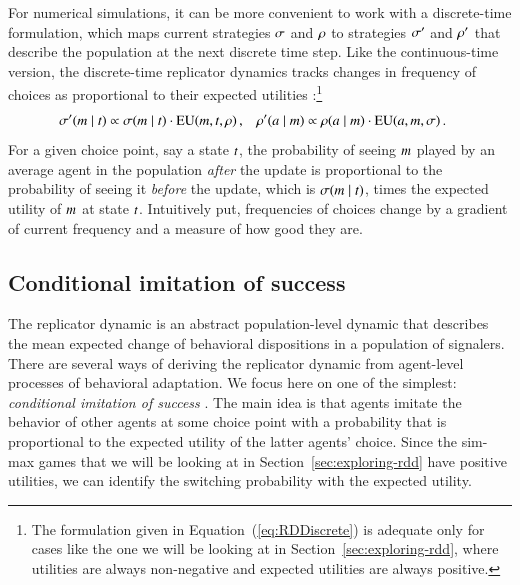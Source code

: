 \documentclass[fleqn,reqno,10pt]{article}
\begin{document}
For numerical simulations, it can be more convenient to work with a discrete-time formulation,
which maps current strategies $\sigma$ and $\rho$ to strategies $\sigma'$ and $\rho'$
that describe the population at the next discrete time step. Like the continuous-time version,
the discrete-time replicator dynamics tracks changes in frequency of choices as proportional to
their expected utilities \citep[e.g.][]{HofbauerSigmund1998:Evolutionary-Ga}:\footnote{The
  formulation given in Equation~(\ref{eq:RDDiscrete}) is adequate only for cases like the one
  we will be looking at in Section~\ref{sec:exploring-rdd}, where utilities are always
  non-negative and expected utilities are always positive.}
\begin{align}
  \label{eq:RDDiscrete}
  \sigma'(m \mid t) & \propto \sigma(m \mid t) \cdot
    \mathrm{EU}(m, t,\rho)\,, & \rho'(a \mid m) & \propto \rho(a \mid m) \cdot
    \mathrm{EU}(a, m,\sigma)\,.   
\end{align}
For a given choice point, say a state $t$, the probability of seeing $m$ played by an
average agent in the population \emph{after} the update is proportional to the probability of
seeing it \emph{before} the update, which is $\sigma(m \mid t)$, times the
expected utility of $m$ at state $t$. Intuitively put, frequencies of choices change
by a gradient of current frequency and a measure of how good they are.

\subsection{Conditional imitation of success}
\label{sec:cond-imit-succ}

The replicator dynamic is an abstract population-level dynamic that describes the mean expected
change of behavioral dispositions in a population of signalers. There are several ways of
deriving the replicator dynamic from agent-level processes of behavioral adaptation. We focus
here on one of the simplest: \emph{conditional imitation of success}
\citep[see][]{Sandholm2010:Population-Game}. The main idea is that agents imitate the behavior
of other agents at some choice point with a probability that is proportional to the expected
utility of the latter agents' choice. Since the sim-max games that we will be looking at in
Section~\ref{sec:exploring-rdd} have positive utilities, we can identify the switching
probability with the expected utility.
\end{document}
